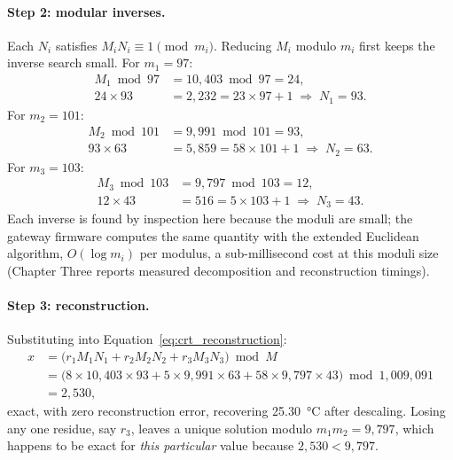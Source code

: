 \paragraph{Step 2: modular inverses.} Each $N_i$ satisfies
$M_i N_i \equiv 1 \pmod{m_i}$. Reducing $M_i$ modulo $m_i$ first keeps the
inverse search small. For $m_1 = 97$:
\begin{align*}
M_1 \bmod 97 &= 10{,}403 \bmod 97 = 24, \\
24 \times 93 &= 2{,}232 = 23 \times 97 + 1
  \;\Rightarrow\; N_1 = 93.
\end{align*}
For $m_2 = 101$:
\begin{align*}
M_2 \bmod 101 &= 9{,}991 \bmod 101 = 93, \\
93 \times 63 &= 5{,}859 = 58 \times 101 + 1
  \;\Rightarrow\; N_2 = 63.
\end{align*}
For $m_3 = 103$:
\begin{align*}
M_3 \bmod 103 &= 9{,}797 \bmod 103 = 12, \\
12 \times 43 &= 516 = 5 \times 103 + 1
  \;\Rightarrow\; N_3 = 43.
\end{align*}
Each inverse is found by inspection here because the moduli are small; the
gateway firmware computes the same quantity with the extended Euclidean
algorithm, $O(\log m_i)$ per modulus, a sub-millisecond cost at this
moduli size (Chapter Three reports measured decomposition and
reconstruction timings).

\paragraph{Step 3: reconstruction.} Substituting into
Equation~\ref{eq:crt_reconstruction}:
\begin{align*}
x &= \bigl( r_1 M_1 N_1 + r_2 M_2 N_2 + r_3 M_3 N_3 \bigr) \bmod M \\
  &= \bigl( 8 \times 10{,}403 \times 93 + 5 \times 9{,}991 \times 63
           + 58 \times 9{,}797 \times 43 \bigr) \bmod 1{,}009{,}091 \\
  &= 2{,}530,
\end{align*}
exact, with zero reconstruction error, recovering \SI{25.30}{\celsius}
after descaling. Losing any one residue, say $r_3$, leaves a unique
solution modulo $m_1 m_2 = 9{,}797$, which happens to be exact for
\emph{this particular} value because $2{,}530 < 9{,}797$.


